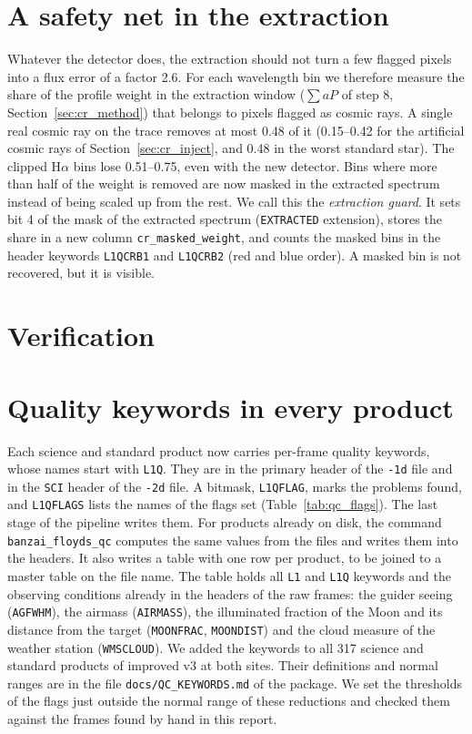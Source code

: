 \section{A safety net in the extraction}
\label{sec:cr_guard}
Whatever the detector does, the extraction should not turn a few flagged pixels into a flux error of a factor 2.6. For
each wavelength bin we therefore measure the share of the profile weight in the extraction window ($\sum aP$ of
step 8, Section~\ref{sec:cr_method}) that belongs to pixels flagged as cosmic rays. A single real cosmic ray on the
trace removes at most 0.48 of it (0.15--0.42 for the artificial cosmic rays of Section~\ref{sec:cr_inject}, and 0.48 in
the worst standard star). The clipped H$\alpha$ bins lose 0.51--0.75, even with the new detector. Bins where more than
half of the weight is removed are now masked in the extracted spectrum instead of being scaled up from the rest. We
call this the \textit{extraction guard}. It sets bit 4 of the mask of the extracted spectrum (\texttt{EXTRACTED}
extension), stores the share in a new column \texttt{cr\_masked\_weight}, and counts the masked bins in the header
keywords \texttt{L1QCRB1} and \texttt{L1QCRB2} (red and blue order). A masked bin is not recovered, but it is visible.



\section{Verification}
\label{sec:cr_verify}


\section{Quality keywords in every product}
\label{sec:qc}
Each science and standard product now carries per-frame quality keywords, whose names start with \texttt{L1Q}. They
are in the primary header of the \texttt{-1d} file and in the \texttt{SCI} header of the \texttt{-2d} file. A bitmask,
\texttt{L1QFLAG}, marks the problems found, and \texttt{L1QFLAGS} lists the names of the flags set
(Table~\ref{tab:qc_flags}). The last stage of the pipeline writes them. For products already on disk, the command
\texttt{banzai\_floyds\_qc} computes the same values from the files and writes them into the headers. It also writes a
table with one row per product, to be joined to a master table on the file name. The table holds all \texttt{L1} and
\texttt{L1Q} keywords and the observing conditions already in the headers of the raw frames: the guider seeing
(\texttt{AGFWHM}), the airmass (\texttt{AIRMASS}), the illuminated fraction of the Moon and its distance from the target
(\texttt{MOONFRAC}, \texttt{MOONDIST}) and the cloud measure of the weather station (\texttt{WMSCLOUD}). We added the
keywords to all 317 science and standard products of improved v3 at both sites. Their definitions and normal ranges are
in the file \texttt{docs/QC\_KEYWORDS.md} of the package. We set the thresholds of the flags just outside the normal
range of these reductions and checked them against the frames found by hand in this report.

